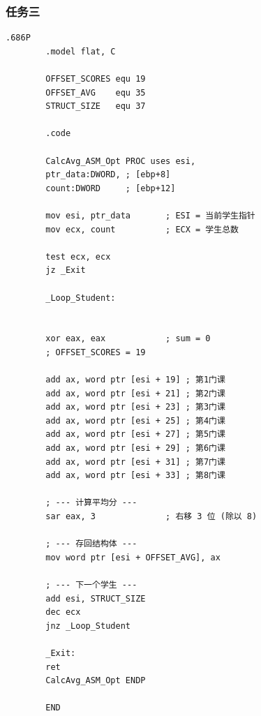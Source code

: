 \documentclass[supercite]{Experimental_Report}
\theoremstyle{definition}
\begin{document}
	\subsubsection{任务三}
	\begin{lstlisting}[style=commonCodeStyle, caption={task3.asm}, label={lst:7-6}]
		.686P
		.model flat, C
		
		OFFSET_SCORES equ 19
		OFFSET_AVG    equ 35
		STRUCT_SIZE   equ 37
		
		.code
		
		CalcAvg_ASM_Opt PROC uses esi,
		ptr_data:DWORD, ; [ebp+8]
		count:DWORD     ; [ebp+12]
		
		mov esi, ptr_data       ; ESI = 当前学生指针
		mov ecx, count          ; ECX = 学生总数
		
		test ecx, ecx
		jz _Exit
		
		_Loop_Student:
		
		
		xor eax, eax            ; sum = 0
		; OFFSET_SCORES = 19
		
		add ax, word ptr [esi + 19] ; 第1门课
		add ax, word ptr [esi + 21] ; 第2门课
		add ax, word ptr [esi + 23] ; 第3门课
		add ax, word ptr [esi + 25] ; 第4门课
		add ax, word ptr [esi + 27] ; 第5门课
		add ax, word ptr [esi + 29] ; 第6门课
		add ax, word ptr [esi + 31] ; 第7门课
		add ax, word ptr [esi + 33] ; 第8门课
		
		; --- 计算平均分 ---
		sar eax, 3              ; 右移 3 位 (除以 8)
		
		; --- 存回结构体 ---
		mov word ptr [esi + OFFSET_AVG], ax
		
		; --- 下一个学生 ---
		add esi, STRUCT_SIZE
		dec ecx
		jnz _Loop_Student
		
		_Exit:
		ret
		CalcAvg_ASM_Opt ENDP
		
		END
		
	\end{lstlisting}
	
\end{document}
